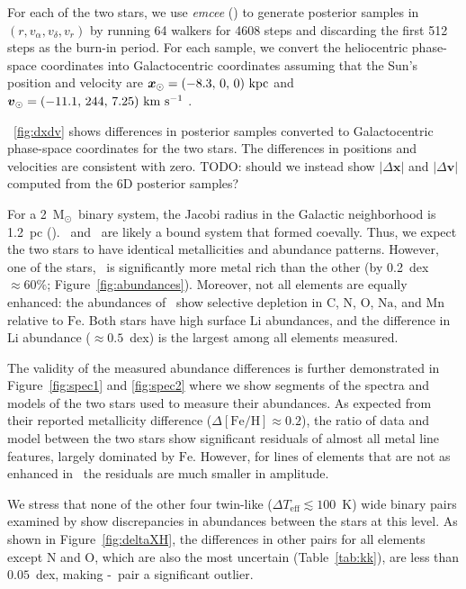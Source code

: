 \documentclass[modern, letterpaper]{aastex61}
\newcommand{\project}[1]{\textsl{#1}}
\newcommand{\figname}{Figure}
\newcommand*\elem[1]{\ensuremath{\mathrm{#1}}}
\newcommand*\elemH[1]{\ensuremath{[\mathrm{#1}/\elem{H}]}}
\newcommand*{\feh}{\ensuremath{\elemH{Fe}}}
\newcommand{\sunanalog}{\text{Krios}}
\newcommand{\bizarreone}{\text{Kronos}}
\newcommand{\bs}[1]{\boldsymbol{#1}}
\renewcommand{\vec}[1]{\bs{#1}}
\newcommand{\kms}{\ensuremath{\rm km~s^{-1}}}
\newcommand{\msun}{\ensuremath{{\mathrm M}_\odot}}
\newcommand{\todo}[1]{{\color{blue}TODO: #1}}
\renewcommand\tablename{Table}
\begin{document}
%
For each of the two stars, we use \project{emcee}
(\citealt{2013PASP..125..306F}) to generate posterior samples in $(r, v_\alpha,
v_\delta, v_r)$ by running 64 walkers for 4608 steps and discarding the first
512 steps as the burn-in period.
For each sample, we convert the heliocentric phase-space coordinates into
Galactocentric coordinates assuming that the Sun's position and velocity are
$\vec x_\odot = (-8.3,\,0,\,0)~{\rm kpc}$ and $\vec v_\odot =
(-11.1,\,244,\,7.25)~\kms$ \citep[e.g.,][]{Schonrich:2010, Schonrich:2012}.

\figurename~\ref{fig:dxdv} shows differences in posterior samples converted to
Galactocentric phase-space coordinates for the two stars.
The differences in positions and velocities are consistent with zero.
\todo{should we instead show $|\Delta\boldsymbol{x}|$ and
$|\Delta\boldsymbol{v}|$ computed from the 6D posterior samples?}

For a 2~\msun\ binary system, the Jacobi radius in the Galactic neighborhood is
1.2~pc (\citealt{jiangtremaine2010}).
\bizarreone\ and \sunanalog\ are likely a bound system that formed coevally.
Thus, we expect the two stars to have identical metallicities and abundance patterns.
However, one of the stars, \bizarreone\ is significantly more metal
rich than the other (by 0.2~dex $\approx 60\%$; \figname~\ref{fig:abundances}).
Moreover, not all elements are equally enhanced:
the abundances of \bizarreone\ show selective depletion in
\elem{C}, \elem{N}, \elem{O}, \elem{Na}, and \elem{Mn}
relative to \elem{Fe}.
Both stars have high surface \elem{Li} abundances, and the difference in
\elem{Li} abundance ($\approx 0.5$~dex) is the largest among all elements
measured.

The validity of the measured abundance differences is further demonstrated
in \figname~\ref{fig:spec1} and \ref{fig:spec2} where we show
segments of the spectra and models of the two stars
used to measure their abundances.
As expected from their reported metallicity difference ($\Delta\feh \approx 0.2$),
the ratio of data and model between the two stars show significant
residuals of almost all metal line features, largely dominated by \elem{Fe}.
However, for lines of elements that are not as enhanced in \bizarreone\,
the residuals are much smaller in amplitude.


We stress that none of the other four twin-like ($\Delta T_\mathrm{eff}
\lesssim 100$~K) wide binary pairs examined by \citealt{2016ApJS..225...32B}
show discrepancies in abundances between the stars at this level.
As shown in \figname~\ref{fig:deltaXH},
the differences in other pairs for all elements except \elem{N} and \elem{O},
which are also the most uncertain (\tablename~\ref{tab:kk}),
are less than $0.05$~dex, making \bizarreone-\sunanalog\ pair a significant outlier.
\end{document}
